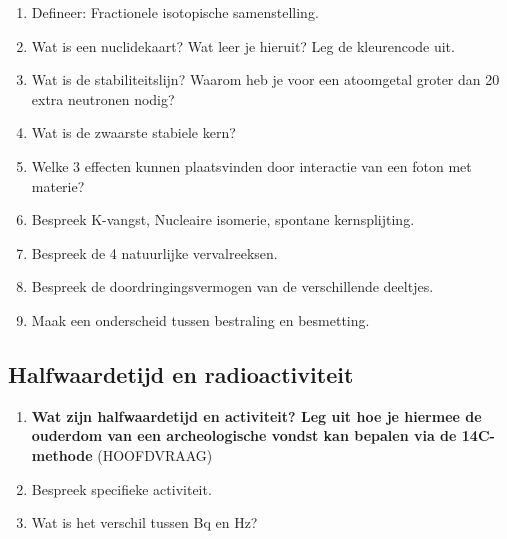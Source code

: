 \documentclass[12pt]{article}
\begin{document}
\begin{enumerate}
        \item Defineer: Fractionele isotopische samenstelling.
        \item Wat is een nuclidekaart? Wat leer je hieruit? Leg de kleurencode uit.
        \item Wat is de stabiliteitslijn? Waarom heb je voor een atoomgetal groter dan 20 extra neutronen nodig?
        \item Wat is de zwaarste stabiele kern? 
        \item Welke 3 effecten kunnen plaatsvinden door interactie van een foton met materie?
        \item Bespreek K-vangst, Nucleaire isomerie, spontane kernsplijting.
        \item Bespreek de 4 natuurlijke vervalreeksen.
        \item Bespreek de doordringingsvermogen van de verschillende deeltjes.
        \item Maak een onderscheid tussen bestraling en besmetting.
    \end{enumerate}
    \subsection{Halfwaardetijd en radioactiviteit}                                                                                                                                                                     
    \begin{enumerate}
        \item \textbf{Wat zijn halfwaardetijd en activiteit? Leg uit hoe je hiermee de ouderdom van een archeologische vondst kan bepalen via de 14C-methode} (HOOFDVRAAG)
        \item Bespreek specifieke activiteit.
        \item Wat is het verschil tussen Bq en Hz?
    \end{enumerate}
    
\end{document}
